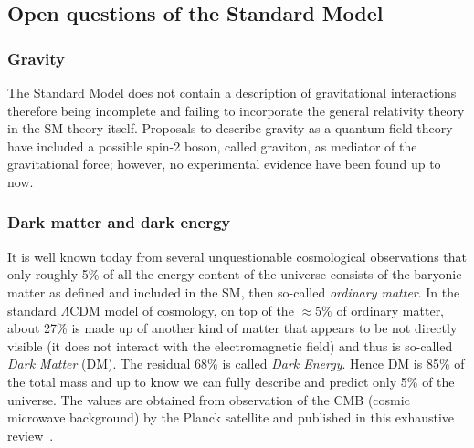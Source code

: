 \subsection{Open questions of the Standard Model}\label{sec:questions}
\subsubsection{Gravity}
The Standard Model does not contain a description of gravitational interactions therefore being incomplete and failing to incorporate the general relativity theory in the SM theory itself. Proposals to describe gravity as a quantum field theory have included a possible spin-2 boson, called graviton, as mediator of the gravitational force; however, no experimental evidence have been found up to now. 

\subsubsection{Dark matter and dark energy}

It is well known today from several unquestionable cosmological observations that only roughly 5$\%$ of all the energy content of the universe consists of the baryonic matter as defined and included in the SM, then so-called \emph{ordinary matter}. In the standard $\Lambda$CDM model of cosmology, on top of the $\approx 5\%$ of ordinary matter, about 27\% is made up of another kind of matter that appears to be not directly visible (it does not interact with the electromagnetic field) and thus is so-called \emph{Dark Matter} (DM). The residual 68\% is called \emph{Dark Energy}. Hence DM is 85\% of the total mass and up to know we can fully describe and predict only 5\% of the universe. The values are obtained from observation of the CMB (cosmic microwave background) by the Planck satellite and published in this exhaustive review~\cite{2020Plank}.

